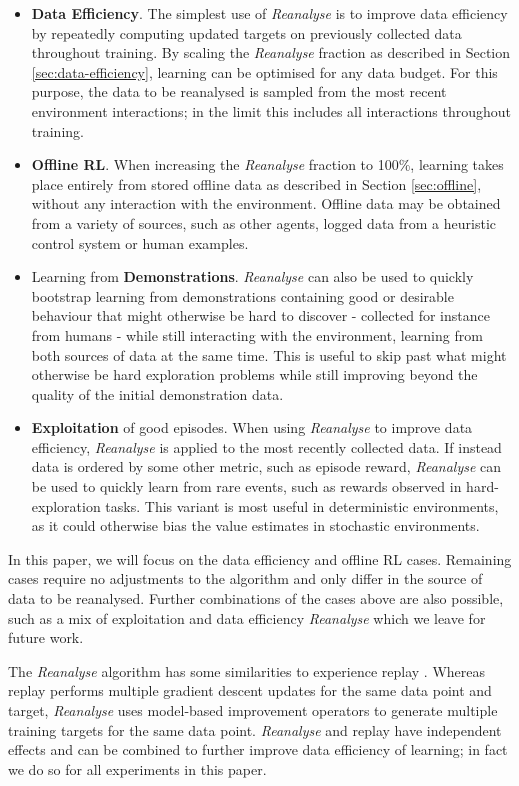 \documentclass{article}
\newcommand{\reanalyse}{\emph{Reanalyse}}
\begin{document}
\begin{itemize}
\setlength\itemsep{0.1em}
\item \textbf{Data Efficiency}. The simplest use of \reanalyse{} is to improve data efficiency by repeatedly computing updated targets on previously collected data throughout training. By scaling the \reanalyse{} fraction as described in Section \ref{sec:data-efficiency}, learning can be optimised for any data budget. For this purpose, the data to be reanalysed is sampled from the  most recent environment interactions; in the limit this includes all interactions throughout training.
\item \textbf{Offline RL}. When increasing the \reanalyse{} fraction to 100\%, learning takes place entirely from stored offline data as described in Section \ref{sec:offline}, without any interaction with the environment. Offline data may be obtained from a variety of sources, such as other agents, logged data from a heuristic control system or human examples.
\item Learning from \textbf{Demonstrations}. \reanalyse{} can also be used to quickly bootstrap learning from demonstrations containing good or desirable behaviour that might otherwise be hard to discover - collected for instance from humans - while still interacting with the environment, learning from both sources of data at the same time. This is useful to skip past what might otherwise be hard exploration problems while still improving beyond the quality of the initial demonstration data.
\item \textbf{Exploitation} of good episodes. When using \reanalyse{} to improve data efficiency, \reanalyse{} is applied to the most recently collected data. If instead data is ordered by some other metric, such as episode reward, \reanalyse{} can be used to quickly learn from rare events, such as rewards observed in hard-exploration tasks. This variant is most useful in deterministic environments, as it could otherwise bias the value estimates in stochastic environments.
\end{itemize}

In this paper, we will focus on the data efficiency and offline RL cases. Remaining cases require no adjustments to the algorithm and only differ in the source of data to be reanalysed. Further combinations of the cases above are also possible, such as a mix of exploitation and data efficiency \reanalyse{} which we leave for future work.

The \reanalyse{} algorithm has some similarities to experience replay \cite{replay}. Whereas replay performs multiple gradient descent updates for the same data point and target, \reanalyse{} uses model-based improvement operators to generate multiple training targets for the same data point. \reanalyse{} and replay have independent effects and can be combined to further improve data efficiency of learning; in fact we do so for all experiments in this paper.
\end{document}

